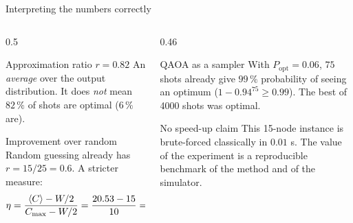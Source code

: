 \documentclass[aspectratio=169,11pt]{beamer}
\begin{document}
\begin{frame}{Interpreting the numbers correctly}
  \begin{columns}[T]
    \begin{column}{0.5\textwidth}
      \begin{block}{Approximation ratio $r = 0.82$}
        An \emph{average} over the output distribution. It does \emph{not} mean $82\,\%$ of shots are optimal ($6\,\%$ are).
      \end{block}
      \begin{block}{Improvement over random}
        Random guessing already has $r = 15/25 = 0.6$. A stricter measure:
        \[ \eta = \frac{\langle C\rangle - W/2}{C_{\max} - W/2} = \frac{20.53 - 15}{10} = 0.553 . \]
      \end{block}
    \end{column}
    \begin{column}{0.46\textwidth}
      \begin{block}{QAOA as a sampler}
        With $P_{\text{opt}} = 0.06$, $75$ shots already give $99\,\%$ probability of seeing an optimum
        ($1 - 0.94^{75} \ge 0.99$). The best of 4000 shots was optimal.
      \end{block}
      \begin{alertblock}{No speed-up claim}
        This 15-node instance is brute-forced classically in $0.01$ s. The value of the experiment is a reproducible
        benchmark of the method and of the simulator.
      \end{alertblock}
    \end{column}
  \end{columns}
\end{frame}
\end{document}
